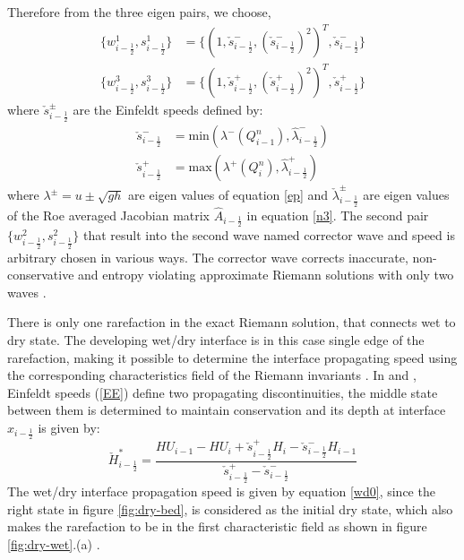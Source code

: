 \documentclass[11pt,a4paper]{article}
\begin{document}
	Therefore from the three eigen pairs, we choose, 
	\begin{equation}
		\begin{aligned}
			\{w^{1}_{i-\frac{1}{2}},s^{1}_{i-\frac{1}{2}}\} &= \{(1,\check{s}_{i-\frac{1}{2}}^{-} ,(\check{s}_{i-\frac{1}{2}}^{-} )^{2})^{T},\check{s}_{i-\frac{1}{2}}^{-} \} \\
			\{w^{3}_{i-\frac{1}{2}},s^{3}_{i-\frac{1}{2}}\} &= \{(1,\check{s}_{i-\frac{1}{2}}^{+} ,(\check{s}_{i-\frac{1}{2}}^{+} )^{2})^{T},\check{s}_{i-\frac{1}{2}}^{+} \} 
		\end{aligned}
	\end{equation}
	where $\check{s}_{i-\frac{1}{2}}^{\pm}$ are the Einfeldt speeds \cite{barzgaran2019numerical,ge:2008,be-ge-le-ma:2011} defined by:
	\begin{equation}
		\begin{aligned}
			\check{s}_{i-\frac{1}{2}}^{-} &= \text{min}(\lambda^{-}(Q^n_{i-1}),\hat{\lambda}_{i-\frac{1}{2}}^{-}) \\
			\check{s}_{i-\frac{1}{2}}^{+} &= \text{max}(\lambda^{+}(Q^n_{i}),\hat{\lambda}_{i-\frac{1}{2}}^{+})
		\end{aligned}
		\label{EE}
	\end{equation}
	where $\lambda^{\pm} = u\pm \sqrt{gh}$ are eigen values of equation \eqref{ep} and $\check{\lambda}_{i-\frac{1}{2}}^{\pm}$ are eigen values of the Roe averaged Jacobian matrix $\hat{A}_{i-\frac{1}{2}}$ in equation \eqref{n3}. The second pair $	\{w^{2}_{i-\frac{1}{2}},s^{2}_{i-\frac{1}{2}}\}$  that result into the second wave named corrector wave and speed is arbitrary chosen in various ways. The corrector wave corrects inaccurate, non-conservative and entropy violating approximate Riemann solutions with only two waves \cite{be-ge-le-ma:2011}.
	
	
	There is only one rarefaction in the exact Riemann solution, that connects wet to dry state. The developing wet/dry interface is in this case single edge of the rarefaction, making it possible to determine the interface propagating speed using the corresponding characteristics field of the Riemann invariants \cite{le-ge-be:2011}. In  \citet{george2006finite} and  \cite{ge:2008}, Einfeldt speeds (\eqref{EE})  define two propagating discontinuities, the  middle state between them is determined to maintain conservation and its depth at interface $x_{i-\frac{1}{2}}$ is given by:
	\begin{equation}
		\check{H}^{*}_{i-\frac{1}{2}} = \frac{HU_{i-1} -HU_{i} + \check{s}_{i-\frac{1}{2}}^{+}H_{i} -\check{s}_{i-\frac{1}{2}}^{-} H_{i-1}  }{\check{s}_{i-\frac{1}{2}}^{+} - \check{s}_{i-\frac{1}{2}}^{-}  }
	\end{equation}
	The wet/dry interface propagation  speed  is given by equation \eqref{wd0}, since the right state in figure \ref{fig:dry-bed}, is considered as the initial dry state, which also makes the rarefaction to be in the first characteristic field as shown in figure \ref{fig:dry-wet}.(a)  \cite{ge:2008}.
	
\end{document}
